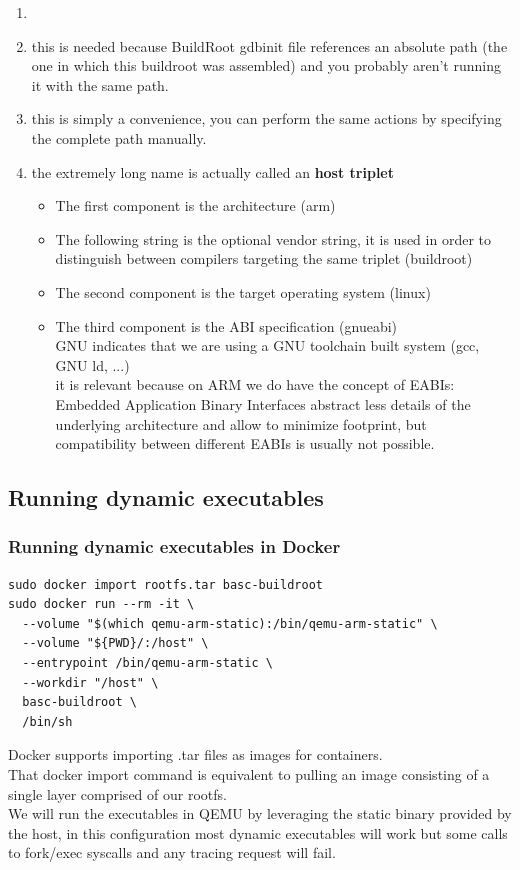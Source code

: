  {
  \begin{enumerate}
    \item 
    \item this is needed because BuildRoot gdbinit file references an absolute path (the one in which this buildroot was assembled)
      and you probably aren't running it with the same path.
    \item this is simply a convenience, you can perform the same actions by specifying the complete path manually.
    \item the extremely long name is actually called an \textbf{host triplet}
    \begin{itemize}
      \item The first component is the architecture (arm)
      \item The following string is the optional vendor string,
        it is used in order to distinguish between compilers targeting the same triplet (buildroot)
      \item The second component is the target operating system (linux)
      \item The third component is the ABI specification (gnueabi) \\
        GNU indicates that we are using a GNU toolchain built system (gcc, GNU ld, ...) \\
        it is relevant because on ARM we do have the concept of EABIs: \\
        Embedded Application Binary Interfaces abstract less details of the underlying architecture and allow 
        to minimize footprint, but compatibility between different EABIs is usually not possible.
    \end{itemize}
  \end{enumerate}
}

\subsection{Running dynamic executables}
\begin{frame}[fragile]
  \frametitle{Running dynamic executables in Docker}
  \begin{verbatim}
sudo docker import rootfs.tar basc-buildroot
sudo docker run --rm -it \
  --volume "$(which qemu-arm-static):/bin/qemu-arm-static" \
  --volume "${PWD}/:/host" \
  --entrypoint /bin/qemu-arm-static \
  --workdir "/host" \
  basc-buildroot \
  /bin/sh
  \end{verbatim}
\end{frame}
\only<handout> {
  Docker supports importing .tar files as images for containers. \\
  That docker import command is equivalent to pulling an image consisting of a single layer comprised of our rootfs. \\
  We will run the executables in QEMU by leveraging the static binary provided by the host, in this configuration
  most dynamic executables will work but some calls to fork/exec syscalls and any tracing request will fail.
}

